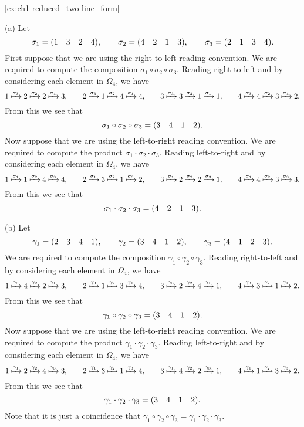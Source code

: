 \begin{solution}{\ref{ex:ch1-reduced_two-line_form}}{(a) Let
    \[
    \sigma_{1} = (1 \quad 3 \quad 2 \quad 4), \qquad \sigma_{2} = (4 \quad 2 \quad 1 \quad 3), \qquad \sigma_{3} = (2 \quad 1 \quad 3 \quad 4).
    \]
    First suppose that we are using the right-to-left reading convention. We are required to compute the composition \(\sigma_{1}\circ\sigma_{2}\circ\sigma_{3}\). Reading right-to-left and by considering each element in \(\Omega_{4}\), we have
    \[
    1 \xmapsto{\sigma_{3}} 2 \xmapsto{\sigma_{2}} 2 \xmapsto{\sigma_{1}} 3,\qquad
    2 \xmapsto{\sigma_{3}} 1 \xmapsto{\sigma_{2}} 4 \xmapsto{\sigma_{1}} 4,\qquad
    3 \xmapsto{\sigma_{3}} 3 \xmapsto{\sigma_{2}} 1 \xmapsto{\sigma_{1}} 1,\qquad
    4 \xmapsto{\sigma_{3}} 4 \xmapsto{\sigma_{2}} 3 \xmapsto{\sigma_{1}} 2.
    \]
    From this we see that
    \[
    \sigma_{1}\circ\sigma_{2}\circ\sigma_{3} = (3 \quad 4 \quad 1 \quad 2).
    \]
    Now suppose that we are using the left-to-right reading convention. We are required to compute the product \(\sigma_{1}\cdot\sigma_{2}\cdot\sigma_{3}\). Reading left-to-right and by considering each element in \(\Omega_{4}\), we have
    \[
    1 \xmapsto{\sigma_{1}} 1 \xmapsto{\sigma_{2}} 4 \xmapsto{\sigma_{3}} 4,\qquad
    2 \xmapsto{\sigma_{1}} 3 \xmapsto{\sigma_{2}} 1 \xmapsto{\sigma_{3}} 2,\qquad
    3 \xmapsto{\sigma_{1}} 2 \xmapsto{\sigma_{2}} 2 \xmapsto{\sigma_{3}} 1,\qquad
    4 \xmapsto{\sigma_{1}} 4 \xmapsto{\sigma_{2}} 3 \xmapsto{\sigma_{3}} 3.
    \]
    From this we see that
    \[
    \sigma_{1}\cdot\sigma_{2}\cdot\sigma_{3} = (4 \quad 2 \quad 1 \quad 3).
    \]

    (b) Let
    \[
    \gamma_{1} = (2 \quad 3 \quad 4 \quad 1), \qquad \gamma_{2} = (3 \quad 4 \quad 1 \quad 2), \qquad \gamma_{3} = (4 \quad 1 \quad 2 \quad 3).
    \]
    We are required to compute the composition \(\gamma_{1}\circ\gamma_{2}\circ\gamma_{3}\). Reading right-to-left and by considering each element in \(\Omega_{4}\), we have
    \[
    1 \xmapsto{\gamma_{3}} 4 \xmapsto{\gamma_{2}} 2 \xmapsto{\gamma_{1}} 3,\qquad
    2 \xmapsto{\gamma_{3}} 1 \xmapsto{\gamma_{2}} 3 \xmapsto{\gamma_{1}} 4,\qquad
    3 \xmapsto{\gamma_{3}} 2 \xmapsto{\gamma_{2}} 4 \xmapsto{\gamma_{1}} 1,\qquad
    4 \xmapsto{\gamma_{3}} 3 \xmapsto{\gamma_{2}} 1 \xmapsto{\gamma_{1}} 2.
    \]
    From this we see that
    \[
    \gamma_{1}\circ\gamma_{2}\circ\gamma_{3} = (3 \quad 4 \quad 1 \quad 2).
    \]
    Now suppose that we are using the left-to-right reading convention. We are required to compute the product \(\gamma_{1}\cdot\gamma_{2}\cdot\gamma_{3}\). Reading left-to-right and by considering each element in \(\Omega_{4}\), we have
    \[
    1 \xmapsto{\gamma_{1}} 2 \xmapsto{\gamma_{2}} 4 \xmapsto{\gamma_{3}} 3,\qquad
    2 \xmapsto{\gamma_{1}} 3 \xmapsto{\gamma_{2}} 1 \xmapsto{\gamma_{3}} 4,\qquad
    3 \xmapsto{\gamma_{1}} 4 \xmapsto{\gamma_{2}} 2 \xmapsto{\gamma_{3}} 1,\qquad
    4 \xmapsto{\gamma_{1}} 1 \xmapsto{\gamma_{2}} 3 \xmapsto{\gamma_{3}} 2.
    \]
    From this we see that
    \[
    \gamma_{1}\cdot\gamma_{2}\cdot\gamma_{3} = (3 \quad 4 \quad 1 \quad 2).
    \]
    Note that it is just a coincidence that \(\gamma_{1}\circ\gamma_{2}\circ\gamma_{3} = \gamma_{1}\cdot\gamma_{2}\cdot\gamma_{3}\).
}\end{solution}
